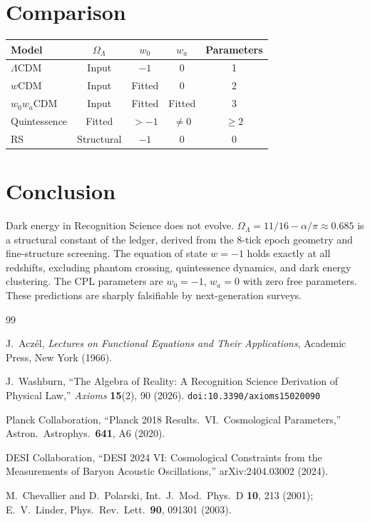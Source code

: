 \documentclass[12pt,a4paper]{article}
\theoremstyle{definition}
\theoremstyle{remark}
\begin{document}
\section{Comparison}
\label{sec:comparison}

\begin{center}
\renewcommand{\arraystretch}{1.3}
\begin{tabular}{lcccc}
\toprule
\textbf{Model} & $\Omega_\Lambda$ & $w_0$ & $w_a$ &
\textbf{Parameters} \\
\midrule
$\Lambda$CDM & Input & $-1$ & $0$ & 1 \\
$w$CDM & Input & Fitted & $0$ & 2 \\
$w_0 w_a$CDM & Input & Fitted & Fitted & 3 \\
Quintessence & Fitted & $> -1$ & $\neq 0$ & $\geq 2$ \\
RS & Structural & $-1$ & $0$ & 0 \\
\bottomrule
\end{tabular}
\end{center}

\section{Conclusion}
\label{sec:conclusion}

Dark energy in Recognition Science does not evolve.
$\Omega_\Lambda = 11/16 - \alpha/\pi \approx 0.685$ is a
structural constant of the ledger, derived from the 8-tick epoch
geometry and fine-structure screening.  The equation of state
$w = -1$ holds exactly at all redshifts, excluding phantom crossing,
quintessence dynamics, and dark energy clustering.  The CPL
parameters are $w_0 = -1$, $w_a = 0$ with zero free parameters.
These predictions are sharply falsifiable by next-generation surveys.

\begin{thebibliography}{99}

J.~Acz\'el, \emph{Lectures on Functional Equations and Their Applications},
Academic Press, New York (1966).

J.~Washburn, ``The Algebra of Reality: A Recognition Science Derivation
of Physical Law,'' \emph{Axioms} \textbf{15}(2), 90 (2026).
\texttt{doi:10.3390/axioms15020090}

Planck Collaboration, ``Planck 2018 Results.\ VI.\ Cosmological
Parameters,'' Astron.\ Astrophys.\ \textbf{641}, A6 (2020).

DESI Collaboration, ``DESI 2024 VI: Cosmological Constraints from
the Measurements of Baryon Acoustic Oscillations,''
arXiv:2404.03002 (2024).

M.~Chevallier and D.~Polarski, Int.\ J.\ Mod.\ Phys.\ D
\textbf{10}, 213 (2001);
E.~V.~Linder, Phys.\ Rev.\ Lett.\ \textbf{90}, 091301 (2003).

\end{thebibliography}
\end{document}
